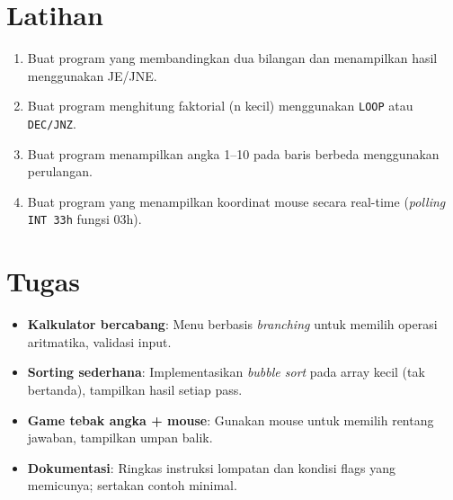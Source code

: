 \section{Latihan}
\begin{enumerate}
  \item Buat program yang membandingkan dua bilangan dan menampilkan hasil menggunakan JE/JNE.
  \item Buat program menghitung faktorial (n kecil) menggunakan \texttt{LOOP} atau \texttt{DEC/JNZ}.
  \item Buat program menampilkan angka 1--10 pada baris berbeda menggunakan perulangan.
  \item Buat program yang menampilkan koordinat mouse secara real-time (\textit{polling} \texttt{INT 33h} fungsi 03h).
\end{enumerate}

\section{Tugas}
\begin{itemize}
  \item \textbf{Kalkulator bercabang}: Menu berbasis \textit{branching} untuk memilih operasi aritmatika, validasi input.
  \item \textbf{Sorting sederhana}: Implementasikan \textit{bubble sort} pada array kecil (tak bertanda), tampilkan hasil setiap pass.
  \item \textbf{Game tebak angka + mouse}: Gunakan mouse untuk memilih rentang jawaban, tampilkan umpan balik.
  \item \textbf{Dokumentasi}: Ringkas instruksi lompatan dan kondisi flags yang memicunya; sertakan contoh minimal.
\end{itemize}

